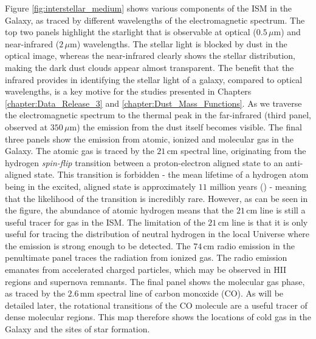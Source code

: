 Figure \ref{fig:interstellar_medium} shows various components of the ISM in the Galaxy, as traced by different wavelengths of the electromagnetic spectrum. The top two panels highlight the starlight that is observable at optical ($0.5\,\mu$m) and near-infrared ($2\,\mu$m) wavelengths. The stellar light is blocked by dust in the optical image, whereas the near-infrared clearly shows the stellar distribution, making the dark dust clouds appear almost transparent. The benefit that the infrared provides in identifying the stellar light of a galaxy, compared to optical wavelengths, is a key motive for the studies presented in Chapters \ref{chapter:Data_Release_3} and \ref{chapter:Dust_Mass_Functions}. As we traverse the electromagnetic spectrum to the thermal peak in the far-infrared (third panel, observed at $350\,\mu$m) the emission from the dust itself becomes visible. The final three panels show the emission from atomic, ionized and molecular gas in the Galaxy. The atomic gas is traced by the $21\,$cm spectral line, originating from the hydrogen \textit{spin-flip} transition between a proton-electron aligned state to an anti-aligned state. This transition is forbidden - the mean lifetime of a hydrogen atom being in the excited, aligned state is approximately $11$ million years (\citealt{Mhaske_2022}) - meaning that the likelihood of the transition is incredibly rare. However, as can be seen in the figure, the abundance of atomic hydrogen means that the $21\,$cm line is still a useful tracer for gas in the ISM. The limitation of the $21\,$cm line is that it is only useful for tracing the distribution of neutral hydrogen in the local Universe where the emission is strong enough to be detected. The $74\,$cm radio emission in the penultimate panel traces the radiation from ionized gas. The radio emission emanates from accelerated charged particles, which may be observed in HII regions and supernova remnants. The final panel shows the molecular gas phase, as traced by the $2.6\,$mm spectral line of carbon monoxide (CO). As will be detailed later, the rotational transitions of the CO molecule are a useful tracer of dense molecular regions. This map therefore shows the locations of cold gas in the Galaxy and the sites of star formation.


